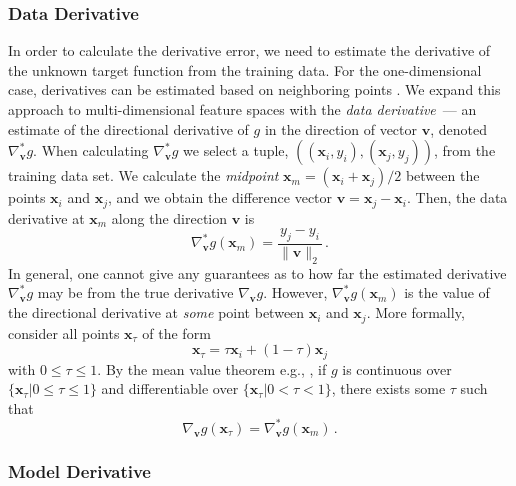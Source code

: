 \documentclass[conference]{IEEEtran}
\begin{document}
\subsubsection{Data Derivative}

In order to calculate the derivative error, we need to estimate the derivative of the unknown target function from the training data. 
For the one-dimensional case, derivatives can be estimated based on neighboring points \cite{kis2021numerical}.
We expand this approach to multi-dimensional feature spaces with the \emph{data derivative}~--- an estimate of the directional derivative of $g$ in the direction of vector $\mathbf{v}$, denoted $\nabla^{*}_{\mathbf{v}}g$. 
When calculating $\nabla^{*}_{\mathbf{v}}g$ we select a tuple, $((\mathbf{x}_i,y_i),(\mathbf{x}_j,y_j))$, from the training data set.
We calculate the \emph{midpoint} $\mathbf{x}_m = (\mathbf{x}_i+\mathbf{x}_j)/2$ between the points $\mathbf{x}_i$ and $\mathbf{x}_j$, and we obtain the difference vector $\mathbf{v} = \mathbf{x}_j - \mathbf{x}_i$.
Then, the data derivative at $\mathbf{x}_m$ along the direction $\mathbf{v}$ is
\begin{equation} 
\nabla^{*}_{\mathbf{v}}g(\mathbf{x}_m) = \frac{y_j - y_i}{\|\mathbf{v}\|_2}\,.
\end{equation}
In general, one cannot give any guarantees as to how far the estimated derivative $\nabla^{*}_{\mathbf{v}}g$ may be from the true derivative $\nabla_{\mathbf{v}}g$. 
However, $\nabla^{*}_{\mathbf{v}}g(\mathbf{x}_m)$ is the value of the directional derivative at \emph{some} point between $\mathbf{x}_{i}$ and $\mathbf{x}_{j}$. More formally, consider all points $\mathbf{x}_{\tau}$ of the form 
\begin{equation}
 \mathbf{x}_{\tau} = \tau \mathbf{x}_{i} + (1-\tau)\mathbf{x}_{j}
\end{equation} 
with $0\leq\tau\leq1$.
By the mean value theorem e.g., \cite{rodhe-et-al-2012-introduction}, if $g$ is continuous over $\{\mathbf{x}_{\tau}|0\leq\tau\leq1\}$ and differentiable over $\{\mathbf{x}_{\tau}|0<\tau<1\}$, there exists some $\tau$ such that 
\begin{equation}
 \nabla_{\mathbf{v}}g(\mathbf{x}_{\tau}) = \nabla^{*}_{\mathbf{v}}g(\mathbf{x}_m)\,.
\end{equation}



\subsubsection{Model Derivative}
\end{document}
